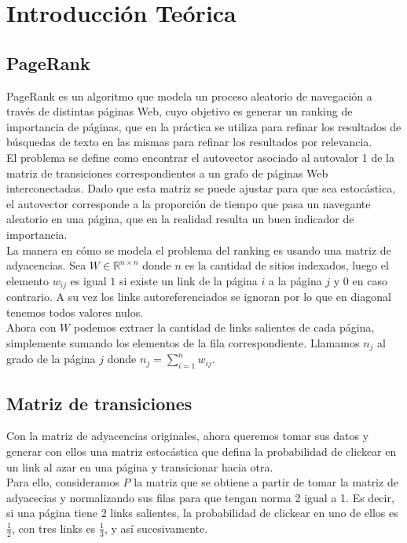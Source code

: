 \section{Introducción Teórica}

\subsection{PageRank}

PageRank es un algoritmo que modela un proceso aleatorio de navegación a través de
distintas páginas Web, cuyo objetivo es generar un ranking de importancia de páginas,
que en la práctica se utiliza para refinar los resultados de búsquedas de texto en las mismas
para refinar los resultados por relevancia.\\

El problema se define como encontrar el autovector asociado al autovalor 1 de la matriz de transiciones
correspondientes a un grafo de páginas Web interconectadas. Dado que esta matriz se puede ajustar
para que sea estocástica, el autovector corresponde a la proporción de tiempo que pasa un navegante
aleatorio en una página, que en la realidad resulta un buen indicador de importancia.\\

La manera en cómo se modela el problema del ranking es usando una matriz de adyacencias.
Sea $W \in \mathbb{R}^{n \times n}$ donde $n$ es la cantidad de sitios indexados, luego el elemento
$w_{ij}$ es igual $1$ si existe un link de la página $i$ a la página $j$ y $0$ en caso
contrario. A su vez los links autoreferenciados se ignoran por lo que en diagonal tenemos todos valores nulos.\\

Ahora con $W$ podemos extraer la cantidad de links salientes de cada página,
simplemente sumando los elementos de la fila correspondiente. Llamamos $n_j$
al grado de la página $j$ donde $n_j = \sum^{n}_{i = 1} w_{ij}$.

\subsection{Matriz de transiciones}

Con la matriz de adyacencias originales, ahora queremos tomar sus datos y generar con ellos
una matriz estocástica que defina la probabilidad de clickear en un link al azar
en una página y transicionar hacia otra.\\

Para ello, consideramos $P$ la matriz que se obtiene a partir de tomar la matriz de
adyacecias y normalizando sus filas para que tengan norma 2 igual a 1. Es decir,
si una página tiene 2 links salientes, la probabilidad de clickear en uno de ellos
es $\frac{1}{2}$, con tres links es $\frac{1}{3}$, y así sucesivamente.\\

